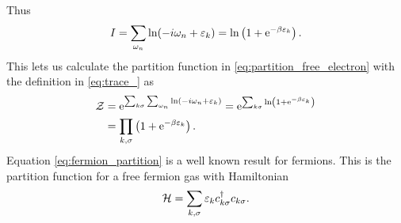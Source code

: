 Thus
\begin{equation}
I = \sum_{\omega_n}\ln(-i\omega_n+\varepsilon_k) = \ln\left(1+\mathrm{e}^{-\beta\varepsilon_k}\right).
\end{equation}
This lets us calculate the partition function in \eqref{eq:partition_free_electron} with the definition in \eqref{eq:trace_} as
\begin{align}
\mathcal{Z} &= \mathrm{e}^{\sum_{k\sigma}\sum_{\omega_n}\ln(-i\omega_n+\varepsilon_k)} = \mathrm{e}^{\sum_{k\sigma}\ln\left(1+\mathrm{e}^{-\beta\varepsilon_k}\right)}\nonumber \\
&= \prod_{k,\sigma}\left(1+\mathrm{e}^{-\beta\varepsilon_k}\right).\label{eq:fermion_partition}
\end{align}
Equation \eqref{eq:fermion_partition} is a well known result for fermions. This is the partition function for a free fermion gas with Hamiltonian 
\begin{equation}
\mathcal{H} = \sum_{k,\sigma}\varepsilon_kc_{k\sigma}^\dagger c_{k\sigma}.
\end{equation}